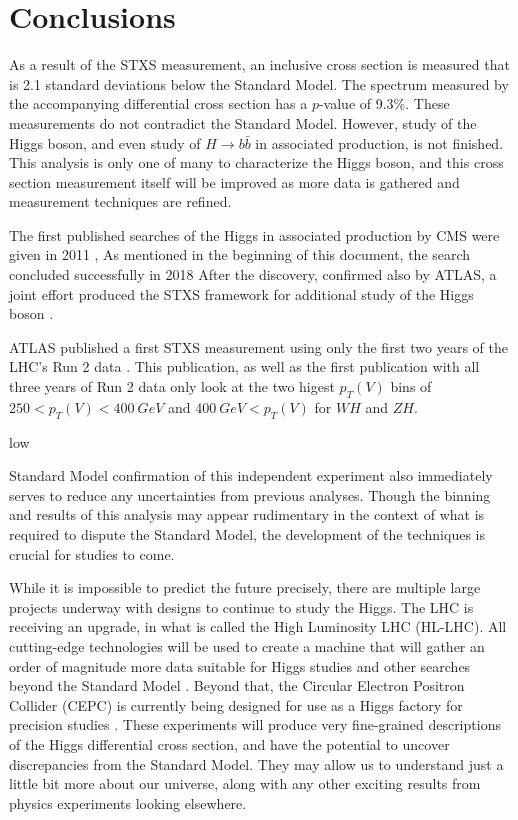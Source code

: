 \chapter{Conclusions} \label{ch:conclusion}

As a result of the STXS measurement,
an inclusive cross section is measured that is 2.1 standard deviations below the Standard Model.
The spectrum measured by the accompanying differential cross section
has a $p$-value of 9.3\%.
These measurements do not contradict the Standard Model.
However, study of the Higgs boson, and even study of $H\rightarrow b\bar{b}$ in
associated production, is not finished.
This analysis is only one of many to characterize the Higgs boson,
and this cross section measurement itself will be improved as more data is gathered
and measurement techniques are refined.

The first published searches of the Higgs in associated production by CMS
were given in 2011 \cite{CMS-PAS-HIG-11-012},
As mentioned in the beginning of this document, the search concluded successfully in 2018
After the discovery, confirmed also by ATLAS,
a joint effort produced the STXS framework for additional study of the
Higgs boson \cite{berger2019simplified}.

ATLAS published a first STXS measurement using only the first two years of the LHC's Run 2 data \cite{Aaboud_2019}.
This publication, as well as the first publication with all three years of Run 2 data \cite{Aad:2727500}
only look at the two higest $p_T(V)$ bins of $250 < p_T(V) < \SI{400}{GeV}$ and $\SI{400}{GeV} < p_T(V)$
for $W\!H$ and $Z\!H$.


low \cite{Aad:2723187}

Standard Model confirmation of this independent experiment also immediately serves to
reduce any uncertainties from previous analyses. 
Though the binning and results of this analysis may appear rudimentary
in the context of what is required to dispute the Standard Model,
the development of the techniques is crucial for studies to
come. 

While it is impossible to predict the future precisely,
there are multiple large projects underway with designs to continue to study the Higgs.
The LHC is receiving an upgrade, in what is called the High Luminosity LHC (HL-LHC).
All cutting-edge technologies will be used to create a machine that will gather
an order of magnitude more data suitable for Higgs studies and
other searches beyond the Standard Model \cite{osti_1365580}.
Beyond that, the Circular Electron Positron Collider (CEPC) is currently being designed
for use as a Higgs factory for precision studies
\cite{thecepcstudygroup2018cepc}. 
These experiments will produce very fine-grained descriptions of
the Higgs differential cross section, and have the potential to uncover
discrepancies from the Standard Model.
They may allow us to understand just a little bit more about our universe,
along with any other exciting results from physics experiments looking elsewhere.





